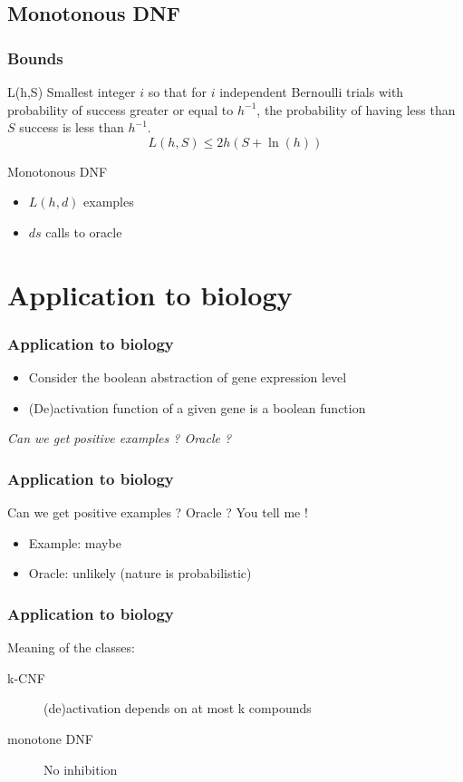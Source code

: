 \documentclass{beamer}
\newcommand{\transition}{\vspace{1em}\flushright \itshape}
\begin{document}
\subsection{Monotonous DNF}
\begin{frame}
	\frametitle{Bounds}
	\begin{block}{L(h,S)}
		Smallest integer $i$ so that for $i$ independent Bernoulli trials with probability of success greater or equal to $h^{-1}$, the probability of having less than $S$ success is less than $h^{-1}$.
		$$L(h,S) \leq 2h\left(S+\ln(h)\right)$$
	\end{block}
	\begin{block}{Monotonous DNF}
		\begin{itemize}
			\item $L(h,d)$ examples
			\item $ds$ calls to oracle
		\end{itemize}
	\end{block}
\end{frame}
\section{Application to biology}
\begin{frame}
	\frametitle{Application to biology}
	\begin{itemize}
		\item Consider the boolean abstraction of gene expression level
		\item (De)activation function of a given gene is a boolean function
	\end{itemize}
	\transition Can we get positive examples ? Oracle ?
\end{frame}
\begin{frame}
	\frametitle{Application to biology}
	Can we get positive examples ? Oracle ? You tell me !
	\begin{itemize}
		\item Example: maybe
		\item Oracle: unlikely (nature is probabilistic)
	\end{itemize}
\end{frame}
\begin{frame}
	\frametitle{Application to biology}
	Meaning of the classes:
	\begin{description}
		\item[k-CNF] (de)activation depends on at most k compounds
		\item[monotone DNF] No inhibition
	\end{description}
\end{frame}
\end{document}
